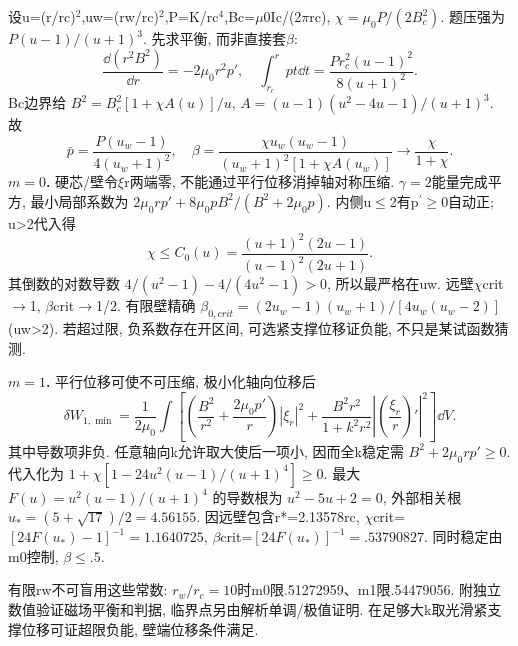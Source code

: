 \begin{solution}
设u=(r/rc)\ensuremath{{}^{2}},uw=(rw/rc)\ensuremath{{}^{2}},P=K/rc\ensuremath{{}^{4}},Bc=\ensuremath{\mu}0Ic/(2\ensuremath{\pi}rc), $\chi=\mu_0P/(2B_c^2)$. 题压强为 $P(u-1)/(u+1)^3$. 先求平衡, 而非直接套\ensuremath{\beta}:
\begin{equation}
 \frac{\dd(r^2B^2)}{\dd r}=-2\mu_0r^2p',\quad
 \int_{r_c}^rpt\dd t=\frac{Pr_c^2(u-1)^2}{8(u+1)^2}.
\end{equation}
Bc边界给 $B^2=B_c^2[1+\chi A(u)]/u$, $A=(u-1)(u^2-4u-1)/(u+1)^3$. 故
\begin{equation}
 \bar p=\frac{P(u_w-1)}{4(u_w+1)^2},\quad
 \beta=\frac{\chi u_w(u_w-1)}{(u_w+1)^2[1+\chi A(u_w)]}
 \longrightarrow\frac\chi{1+\chi}.
\end{equation}
\textbf{$m=0$.} 硬芯/壁令\ensuremath{\xi}r两端零, 不能通过平行位移消掉轴对称压缩. $\gamma=2$能量完成平方, 最小局部系数为 $2\mu_0rp'+8\mu_0pB^2/(B^2+2\mu_0p)$. 内侧u\ensuremath{\le}2有p\ensuremath{{}^{\prime}}\ensuremath{\ge}0自动正; u>2代入得
\begin{equation}
 \chi\le C_0(u)=\frac{(u+1)^2(2u-1)}{(u-1)^2(2u+1)}.
\end{equation}
其倒数的对数导数 $4/(u^2-1)-4/(4u^2-1)>0$, 所以最严格在uw. 远壁\ensuremath{\chi}crit\ensuremath{\to}1, \ensuremath{\beta}crit\ensuremath{\to}1/2. 有限壁精确 $\beta_{0,crit}=(2u_w-1)(u_w+1)/[4u_w(u_w-2)]$ (uw>2). 若超过限, 负系数存在开区间, 可选紧支撑位移证负能, 不只是某试函数猜测.

\textbf{$m=1$.} 平行位移可使不可压缩, 极小化轴向位移后
\begin{equation}
 \delta W_{1,\min}=\frac1{2\mu_0}\int\left[
 \left(\frac{B^2}{r^2}+\frac{2\mu_0p'}r\right)|\xi_r|^2
 +\frac{B^2r^2}{1+k^2r^2}\left|\left(\frac{\xi_r}r\right)'\right|^2\right]\dd V.
\end{equation}
其中导数项非负. 任意轴向k允许取大使后一项小, 因而全k稳定需 $B^2+2\mu_0rp'\ge0$. 代入化为
$1+\chi[1-24u^2(u-1)/(u+1)^4]\ge0$.
最大 $F(u)=u^2(u-1)/(u+1)^4$ 的导数根为 $u^2-5u+2=0$, 外部相关根 $u_*=(5+\sqrt{17})/2=4.56155$. 因远壁包含r*=2.13578rc, \ensuremath{\chi}crit=$[24F(u_*)-1]^{-1}=1.1640725$, \ensuremath{\beta}crit=$[24F(u_*)]^{-1}=.53790827$. 同时稳定由m0控制, $\boxed{\beta\le.5}$.

有限rw不可盲用这些常数: $r_w/r_c=10$时m0限.51272959、m1限.54479056. 附独立数值验证磁场平衡和判据, 临界点另由解析单调/极值证明. 在足够大k取光滑紧支撑位移可证超限负能, 壁端位移条件满足.
\end{solution}
